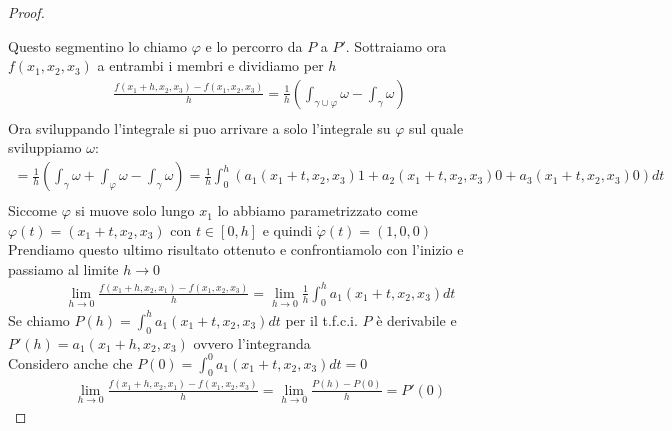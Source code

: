 \documentclass[a4paper, oneside]{article}
\begin{document}
\begin{proof}
\begin{center}
    \end{center}
    Questo segmentino lo chiamo $\varphi$ e lo percorro da $P$ a $P'$. Sottraiamo ora $f(x_1,x_2,x_3)$ a entrambi i membri e dividiamo per $h$\\
    \begin{gather*}
        \frac{f(x_1+h,x_2,x_3) - f(x_1,x_2,x_3)}{h} =\frac{1}{h} \left( \int_{\gamma \cup \varphi} \omega - \int_{\gamma} \omega\right) \\
    \end{gather*}
    Ora sviluppando l'integrale si puo arrivare a solo l'integrale su $\varphi$ sul quale sviluppiamo $\omega$:
    \begin{gather*}
        =\frac{1}{h} \left( \int_{\gamma} \omega + \int_{\varphi} \omega - \int_{\gamma} \omega\right)  = \frac{1}{h} \int_{0}^{h} \left( a_1(x_1+t,x_2,x_3) 1 + a_2(x_1+t,x_2,x_3) 0 + a_3(x_1+t,x_2,x_3) 0 \right)dt\\
    \end{gather*}
    Siccome $\varphi$ si muove solo lungo $x_1$ lo abbiamo parametrizzato come $\varphi(t) = (x_1+t,x_2,x_3)$ con $t \in [0,h]$ e quindi $\dot{\varphi}(t) = (1,0,0)$\\
    Prendiamo questo ultimo risultato ottenuto e confrontiamolo con l'inizio e passiamo al limite $h \to 0$
    \begin{gather*}
        \lim_{h \to 0} \frac{f(x_1+h,x_2,x_1) - f(x_1,x_2,x_3)}{h} = \lim_{h \to 0} \frac{1}{h} \int_{0}^{h} a_1(x_1+t,x_2,x_3) dt
    \end{gather*}
    Se chiamo $P(h) = \int_{0}^{h} a_1(x_1+t,x_2,x_3) dt$ per il t.f.c.i. $P$ è derivabile e $P'(h) = a_1(x_1+h,x_2,x_3)$ ovvero l'integranda\\
    Considero anche che $P(0) = \int_{0}^{0} a_1(x_1+t,x_2,x_3) dt = 0$
    \begin{gather*}
        \lim_{h \to 0} \frac{f(x_1+h,x_2,x_1) - f(x_1,x_2,x_3)}{h} = \lim_{h \to 0} \frac{P(h) - P(0)}{h} = P'(0)
    \end{gather*}


\end{proof}
\end{document}
